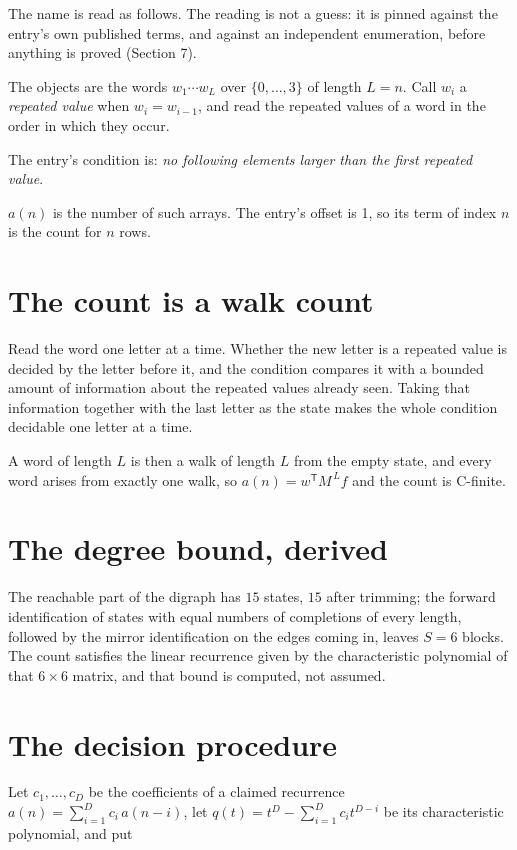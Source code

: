 \documentclass[11pt]{article}
\theoremstyle{definition}
\begin{document}
The name is read as follows. The reading is not a guess: it is pinned against the entry's own published terms, and against an independent enumeration, before anything is proved (Section 7).

The objects are the words $w_1\cdots w_L$ over $\{0,\dots,3\}$ of length $L = n$. Call $w_i$ a {\itshape repeated value} when $w_i = w_{i-1}$, and read the repeated values of a word in the order in which they occur.

The entry's condition is: {\itshape no following elements larger than the first repeated value}.

$a(n)$ is the number of such arrays. The entry's offset is 1, so its term of index $n$ is the count for $n$ rows.

\section{The count is a walk count}

Read the word one letter at a time. Whether the new letter is a repeated value is decided by the letter before it, and the condition compares it with a bounded amount of information about the repeated values already seen. Taking that information together with the last letter as the state makes the whole condition decidable one letter at a time.

A word of length $L$ is then a walk of length $L$ from the empty state, and every word arises from exactly one walk, so $a(n) = w^{\mathsf T}M^{\,L}f$ and the count is C-finite.

\section{The degree bound, derived}

The reachable part of the digraph has $15$ states, $15$ after trimming; the forward identification of states with equal numbers of completions of every length, followed by the mirror identification on the edges coming in, leaves $S = 6$ blocks. The count satisfies the linear recurrence given by the characteristic polynomial of that $6\times6$ matrix, and that bound is computed, not assumed.

\section{The decision procedure}

Let $c_1,\dots,c_D$ be the coefficients of a claimed recurrence $a(n) = \sum_{i=1}^{D} c_i\,a(n-i)$, let $q(t) = t^{D} - \sum_{i=1}^{D} c_i t^{D-i}$ be its characteristic polynomial, and put
\end{document}
